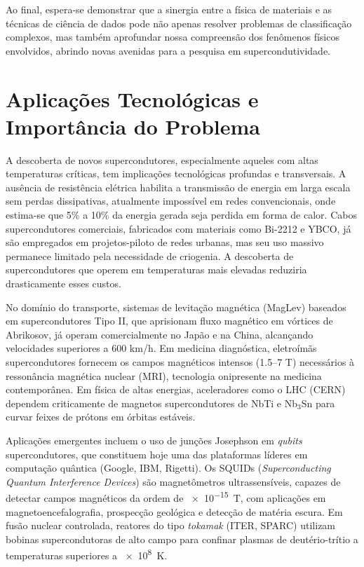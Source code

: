 \documentclass[12pt, a4paper, oneside]{report}
\begin{document}
Ao  final, espera-se demonstrar que a sinergia entre a física de materiais e as técnicas de ciência de dados pode não apenas resolver problemas de classificação complexos, mas também aprofundar nossa compreensão dos fenômenos físicos envolvidos, abrindo novas avenidas para a pesquisa em supercondutividade.

\section{Aplicações Tecnológicas e Importância do Problema}

A descoberta de novos supercondutores, especialmente aqueles com altas temperaturas críticas, tem implicações tecnológicas profundas e transversais. A ausência de resistência elétrica habilita a transmissão de energia em larga escala sem perdas dissipativas, atualmente impossível em redes convencionais, onde estima-se que 5\% a 10\% da energia gerada seja perdida em forma de calor. Cabos supercondutores comerciais, fabricados com materiais como Bi-2212 e YBCO, já são empregados em projetos-piloto de redes urbanas, mas seu uso massivo permanece limitado pela necessidade de criogenia. A descoberta de supercondutores que operem em temperaturas mais elevadas reduziria drasticamente esses custos.

No domínio do transporte, sistemas de levitação magnética (MagLev) baseados em supercondutores Tipo II, que aprisionam fluxo magnético em vórtices de Abrikosov, já operam comercialmente no Japão e na China, alcançando velocidades superiores a 600 km/h. Em medicina diagnóstica, eletroímãs supercondutores fornecem os campos magnéticos intensos (1.5--7 T) necessários à ressonância magnética nuclear (MRI), tecnologia onipresente na medicina contemporânea. Em física de altas energias, aceleradores como o LHC (CERN) dependem criticamente de magnetos supercondutores de NbTi e Nb$_3$Sn para curvar feixes de prótons em órbitas estáveis.

Aplicações emergentes incluem o uso de junções Josephson em \textit{qubits} supercondutores, que constituem hoje uma das plataformas líderes em computação quântica (Google, IBM, Rigetti). Os SQUIDs (\textit{Superconducting Quantum Interference Devices}) são magnetômetros ultrassensíveis, capazes de detectar campos magnéticos da ordem de \SI{e-15}{\tesla}, com aplicações em magnetoencefalografia, prospecção geológica e detecção de matéria escura. Em fusão nuclear controlada, reatores do tipo \textit{tokamak} (ITER, SPARC) utilizam bobinas supercondutoras de alto campo para confinar plasmas de deutério-trítio a temperaturas superiores a \SI{e8}{\kelvin}.
\end{document}
